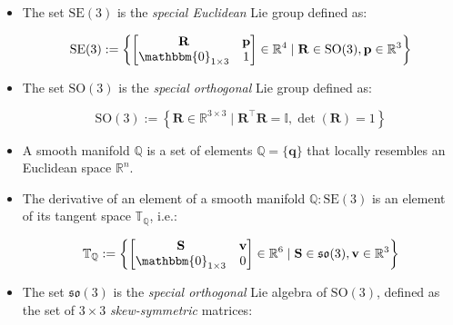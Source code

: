 \begin{itemize}
    \item The set $\mathrm{SE}(3)$ is the \textit{special Euclidean} Lie group defined as:

          \begin{equation}
              \mathrm{SE}(3) := \left\{
              \begin{bmatrix}
                  \mathbf{R}                & \mathbf{p} \\
                  \mathbbm{0} _{1 \times 3} & 1
              \end{bmatrix} \in \mathbb{R} ^4 \mid \mathbf{R} \in \mathrm{SO}(3), \mathbf{p} \in \mathbb{R} ^3
              \right\}
          \end{equation}

    \item The set $\mathrm{SO}(3)$ is the \textit{special orthogonal} Lie group defined as:

          \begin{equation}
              \label{eqn:SO3}
              \mathrm{SO}(3) := \left\{
              \mathbf{R} \in \mathbb{R} ^{3 \times 3} \mid \mathbf{R} ^\top \mathbf{R} = \mathbb{I}, \det(\mathbf{R}) = 1
              \right\}
          \end{equation}

    \item A smooth manifold $\mathbb{Q}$ is a set of elements $\mathbb{Q} = \{ \mathbf{q} \}$ that locally resembles an Euclidean space $\mathbb{R} ^n$.

    \item The derivative of an element of a smooth manifold $\mathbb{Q} : \mathrm{SE}(3)$ is an element of its tangent space $\mathbb{T} _{\mathbb{Q}}$, i.e.:

          \begin{equation}
              \mathbb{T} _{\mathbb{Q}} := \left\{
              \begin{bmatrix}
                  \mathbf{S}                & \mathbf{v} \\
                  \mathbbm{0} _{1 \times 3} & 0
              \end{bmatrix} \in \mathbb{R} ^6 \mid \mathbf{S} \in \mathfrak{so}(3), \mathbf{v} \in \mathbb{R} ^3
              \right\}
          \end{equation}

    \item The set $\mathfrak{so}(3)$ is the \textit{special orthogonal} Lie algebra of $\mathrm{SO}(3)$, defined as the set of $3\times3$ \textit{skew-symmetric} matrices:


\end{itemize}
